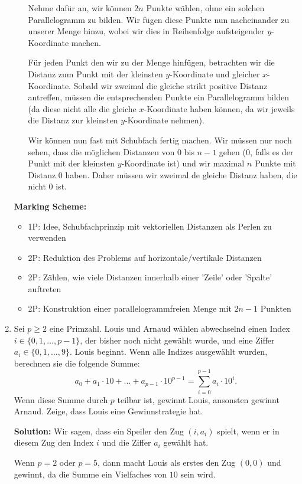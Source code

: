 \documentclass[language=german,style=solution]{smo}
\begin{document}
\begin{enumerate}[label=\textbf{\arabic*.}]
\begin{itemize}
Nehme dafür an, wir können $2n$ Punkte wählen, ohne ein solchen Parallelogramm zu bilden. Wir fügen diese Punkte nun nacheinander zu unserer Menge hinzu, wobei wir dies in Reihenfolge aufsteigender $y$-Koordinate machen. 

Für jeden Punkt den wir zu der Menge hinfügen, betrachten wir die Distanz zum Punkt mit der kleinsten $y$-Koordinate und gleicher $x$-Koordinate. Sobald wir zweimal die gleiche strikt positive Distanz antreffen, müssen die entsprechenden Punkte ein Parallelogramm bilden (da diese nicht alle die gleiche $x$-Koordinate haben können, da wir jeweils die Distanz zur kleinsten $y$-Koordinate nehmen).

Wir können nun fast mit Schubfach fertig machen. Wir müssen nur noch sehen, dass die möglichen Distanzen von 0 bis $n-1$ gehen (0, falls es der Punkt mit der kleinsten $y$-Koordinate ist) und wir maximal $n$ Punkte mit Distanz 0 haben. Daher müssen wir zweimal de gleiche Distanz haben, die nicht 0 ist.
\end{itemize}

\textbf{Marking Scheme:}
\begin{itemize}
	\item 1P: Idee, Schubfachprinzip mit vektoriellen Distanzen als Perlen zu verwenden
	\item 2P: Reduktion des Problems auf horizontale/vertikale Distanzen
	\item 2P: Zählen, wie viele Distanzen innerhalb einer 'Zeile' oder 'Spalte' auftreten
	\item 2P: Konstruktion einer parallelogrammfreien Menge mit $2n-1$ Punkten
\end{itemize}


\newpage

\item Sei $p\geq 2$ eine Primzahl. Louis und Arnaud wählen abwechselnd einen Index $i\in\{0,1,\ldots,p-1\}$, der bisher noch nicht gewählt wurde, und eine Ziffer $a_i\in\{0,1,\ldots,9\}$. Louis beginnt. Wenn alle Indizes ausgewählt wurden, berechnen sie die folgende Summe:
\[
a_0+a_1\cdot 10+\ldots+a_{p-1}\cdot 10^{p-1}=\sum_{i=0}^{p-1}a_i\cdot 10^i.
\]
Wenn diese Summe durch $p$ teilbar ist, gewinnt Louis, ansonsten gewinnt Arnaud. Zeige, dass Louis eine Gewinnstrategie hat.

\textbf{Solution:}
Wir sagen, dass ein Speiler den Zug $(i, a_i)$ spielt, wenn er in diesem Zug den Index $i$ und die Ziffer $a_i$ gewählt hat.

Wenn $p=2$ oder $p=5$, dann macht Louis als erstes den Zug $(0,0)$ und gewinnt, da die Summe ein Vielfaches von $10$ sein wird.


\end{enumerate}
\end{document}
